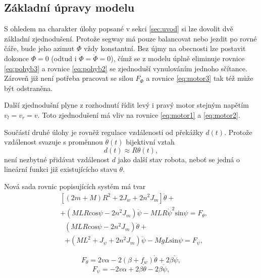 \documentclass[conference]{IEEEtran}
\begin{document}
\subsection{Základní úpravy modelu}
S ohledem na charakter úlohy popsané v sekci \ref{sec:uvod} si lze dovolit dvě základní zjednodušení. Protože segway
má pouze balancovat nebo jezdit po rovné čáře, bude jeho azimut $\varPhi$ vždy konstantní. 
Bez újmy na obecnosti lze postavit dokonce $\varPhi = 0$ (odtud i $\dot{\varPhi} = \ddot{\varPhi} = 0$),
čímž se z modelu úplně eliminuje rovnice \eqref{eq:pohyb3}
a rovnice \eqref{eq:pohyb2} se zjednoduší vynulováním jednoho sčítance. Zároveň již není potřeba pracovat se silou $F_\varPhi$
a rovnice \eqref{eq:motor3} tak též může být odstraněna.

Další zjednodušní plyne z rozhodnutí řídit levý i pravý motor stejným napětím $v_l = v_r = v$.
Toto zjednodušení má vliv na rovnice \eqref{eq:motor1} a \eqref{eq:motor2}.

Součástí druhé úlohy je rovněž regulace vzdálenosti od překážky $d(t)$.
Protože vzdálenost svazuje s proměnnou $\theta(t)$ bijektivní vztah
\begin{equation}
    d(t) \approx R \theta(t),
    \label{eq:vzdalenost}
\end{equation}
není nezbytné přidávat vzdálenost $d$ jako další stav robota, neboť se jedná o lineární funkci již existujícícho stavu $\theta$.

Nová sada rovnic popisujících systém má tvar
\begin{equation}
    \begin{aligned}
        &\left[(2m + M) R^2 + 2 J_w + 2n^2 J_m\right] \ddot{\theta} + \\
        &+ (MLR \text{cos} \psi - 2n^2 J_m) \ddot{\psi} - MLR\dot{\psi}^2 \text{sin} \psi = F_\theta,
    \end{aligned}
    \label{eq:pohyb1_easy}
\end{equation}
\begin{equation}
    \begin{aligned}
        & (MLR \text{cos} \psi - 2n^2 J_m) \ddot{\theta} + \\
        & + (ML^2 + J_\psi + 2n^2 J_m) \ddot{\psi} - MgL\text{sin}\psi = F_\psi,
    \end{aligned}
    \label{eq:pohyb2_easy}
\end{equation}

\begin{equation}
    F_\theta = 2v \alpha - 2(\beta + f_w) \dot{\theta} + 2\beta\dot{\psi},
    \label{eq:motor1_easy}
\end{equation}
\begin{equation}
    F_\psi = - 2v \alpha + 2\beta \dot{\theta} - 2\beta \dot{\psi},
    \label{eq:motor2_easy}
\end{equation}
\end{document}
